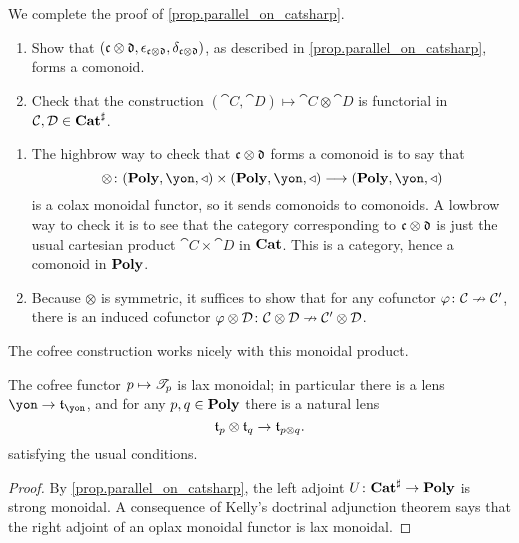 \documentclass[Book-Poly]{subfiles}
\begin{document}
\begin{exercise}\label{exc.parallel_on_catsharp}
We complete the proof of \cref{prop.parallel_on_catsharp}.
\begin{enumerate}
	\item Show that $(\mathfrak{c}\otimes\mathfrak{d},\epsilon_{\mathfrak{c}\otimes\mathfrak{d}},\delta_{\mathfrak{c}\otimes\mathfrak{d}})$, as described in \cref{prop.parallel_on_catsharp}, forms a comonoid.
	\item Check that the construction $(\cat{C},\cat{D})\mapsto\cat{C}\otimes\cat{D}$ is functorial in $\mathcal{C},\mathcal{D}\in\mathbf{Cat}^\sharp$.
\qedhere
\end{enumerate}
\begin{solution}
\begin{enumerate}
    \item The highbrow way to check that $\mathfrak{c}\otimes\mathfrak{d}$ forms a comonoid is to say that
    \[\otimes\colon(\poly,\yon,\tri)\times(\poly,\yon,\tri)\too(\poly,\yon,\tri)\]
     is a colax monoidal functor, so it sends comonoids to comonoids. A lowbrow way to check it is to see that the category corresponding to $\mathfrak{c}\otimes\mathfrak{d}$ is just the usual cartesian product $\cat{C}\times\cat{D}$ in $\mathbf{Cat}$. This is a category, hence a comonoid in $\mathbf{Poly}$.
    \item Because $\otimes$ is symmetric, it suffices to show that for any cofunctor $\varphi\colon\mathcal{C}\nrightarrow\mathcal{C}'$, there is an induced cofunctor $\varphi\otimes\mathcal{D}\colon\mathcal{C}\otimes\mathcal{D}\nrightarrow\mathcal{C}'\otimes\mathcal{D}$.
\end{enumerate}
\end{solution}
\end{exercise}

The cofree construction works nicely with this monoidal product.

\begin{proposition}\label{prop.cofree_lax_monoidal}
The cofree functor $p\mapsto\mathscr{T}_{p}$ is lax monoidal; in particular there is a lens $\yon\to\car{t}_\yon$, and for any $p,q\in\mathbf{Poly}$ there is a natural lens
\[
	\mathfrak{t}_p\otimes\mathfrak{t}_q\to\mathfrak{t}_{p\otimes q}.
\]
satisfying the usual conditions.
\end{proposition}
\begin{proof}
By \cref{prop.parallel_on_catsharp}, the left adjoint $U\colon\mathbf{Cat}^\sharp\to\mathbf{Poly}$ is strong monoidal. A consequence of Kelly's doctrinal adjunction theorem \cite{kelly1974doctrinal} says that the right adjoint of an oplax monoidal functor is lax monoidal.
\end{proof}
\end{document}
